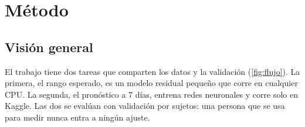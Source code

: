 \chapter{Método}\label{cap:metodo}

\section{Visión general}

El trabajo tiene dos tareas que comparten los datos y la validación (\cref{fig:flujo}). La primera, el rango esperado,
es un modelo residual pequeño que corre en cualquier CPU. La segunda, el pronóstico a 7 días, entrena redes neuronales
y corre solo en Kaggle. Las dos se evalúan con validación por sujetos: una persona que se usa para medir nunca entra a
ningún ajuste.

